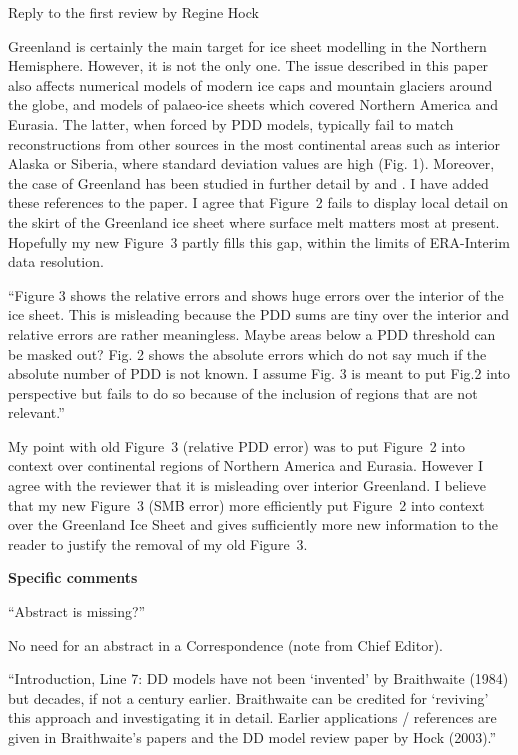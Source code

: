 \documentclass{letter}
\newcommand{\rev}[0]{\color{blue!50!black}\it}
\newcommand{\revpoint}[1]{{\rev\item``#1''}}
\begin{document}
\begin{letter}{Reply to the first review by Regine Hock}
\begin{enumerate}[resume]
    Greenland is certainly the main target for ice sheet modelling in the Northern Hemisphere. However, it is not the only one. The issue described in this paper also affects numerical models of modern ice caps and mountain glaciers around the globe, and models of palaeo-ice sheets which covered Northern America and Eurasia. The latter, when forced by PDD models, typically fail to match reconstructions from other sources in the most continental areas such as interior Alaska or Siberia, where standard deviation values are high (Fig. 1). Moreover, the case of Greenland has been studied in further detail by \citet{fausto-etal-2011} and \citet{rau-rogozhina-2013}. I have added these references to the paper. I agree that Figure~2 fails to display local detail on the skirt of the Greenland ice sheet where surface melt matters most at present. Hopefully my new Figure~3 partly fills this gap, within the limits of ERA-Interim data resolution.

    \revpoint{Figure 3 shows the relative errors and shows huge errors over the interior of the ice sheet. This is misleading because the PDD sums are tiny over the interior and relative errors are rather meaningless. Maybe areas below a PDD threshold can be masked out? Fig. 2 shows the absolute errors which do not say much if the absolute number of PDD is not known. I assume Fig. 3 is meant to put Fig.2 into perspective but fails to do so because of the inclusion of regions that are not relevant.}

    My point with old Figure~3 (relative PDD error) was to put Figure~2 into context over continental regions of Northern America and Eurasia. However I agree with the reviewer that it is misleading over interior Greenland. I believe that my new Figure~3 (SMB error) more efficiently put Figure~2 into context over the Greenland Ice Sheet and gives sufficiently more new information to the reader to justify the removal of my old Figure~3.

\end{enumerate}


\textbf{Specific comments}

\begin{enumerate}[resume]

    \revpoint{Abstract is missing?}

    No need for an abstract in a Correspondence (note from Chief Editor).

    \revpoint{Introduction, Line 7: DD models have not been ‘invented’ by Braithwaite (1984) but decades, if not a century earlier. Braithwaite can be credited for ‘reviving’ this approach and investigating it in detail. Earlier applications / references are given in Braithwaite’s papers and the DD model review paper by Hock (2003).}


\end{enumerate}
\end{letter}
\end{document}
